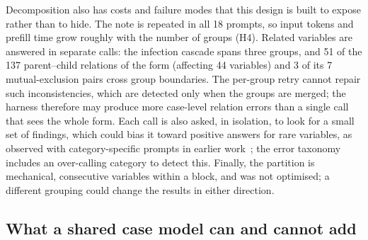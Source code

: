 Decomposition also has costs and failure modes that this design is built to expose rather than to hide.
The note is repeated in all 18 prompts, so input tokens and prefill time grow roughly with the number of
groups (H4). Related variables are answered in separate calls: the infection cascade spans three groups, and
51 of the 137 parent--child relations of the form (affecting 44 variables) and 3 of its 7 mutual-exclusion
pairs cross group boundaries. The per-group retry cannot
repair such inconsistencies, which are detected only when the groups are merged; the harness therefore
may produce more case-level relation errors than a single call that sees the whole form. Each call is
also asked, in isolation, to look for a small set of findings, which could bias it toward positive
answers for rare variables, as observed with category-specific prompts in earlier
work~\cite{agrawal2022fewshot}; the error taxonomy includes an over-calling category to detect this. Finally,
the partition is mechanical, consecutive variables within a block, and was not optimised; a different
grouping could change the results in either direction.

\subsection{What a shared case model can and cannot add}

